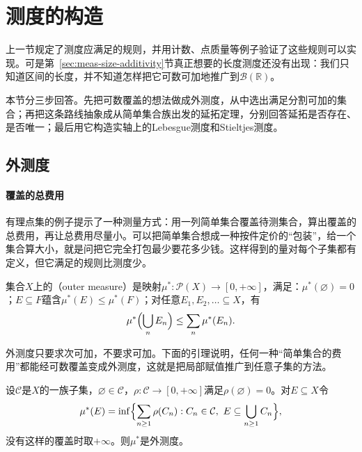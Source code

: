\section{测度的构造}
\label{sec:meas-construction}

上一节规定了测度应满足的规则，并用计数、点质量等例子验证了这些规则可以实现。可是第~\ref{sec:meas-size-additivity}节真正想要的长度测度还没有出现：我们只知道区间的长度，并不知道怎样把它可数可加地推广到$\mathcal B(\mathbb R)$。

本节分三步回答。先把可数覆盖的想法做成外测度，从中选出满足分割可加的集合；再把这条路线抽象成从简单集合族出发的延拓定理，分别回答延拓是否存在、是否唯一；最后用它构造实轴上的Lebesgue测度和Stieltjes测度。

\subsection{外测度}
\label{sec:meas-outer-measure}

\paragraph{覆盖的总费用}
有理点集的例子提示了一种测量方式：用一列简单集合覆盖待测集合，算出覆盖的总费用，再让总费用尽量小。可以把简单集合想成一种按件定价的“包装”，给一个集合算大小，就是问把它完全打包最少要花多少钱。这样得到的量对每个子集都有定义，但它满足的规则比测度少。

\begin{definition}[外测度]
\label{def:meas-outer}
集合$X$上的（outer measure）是映射$\mu^*:\mathcal P(X)\to[0,+\infty]$，满足：$\mu^*(\varnothing)=0$；$E\subseteq F$蕴含$\mu^*(E)\leq\mu^*(F)$；对任意$E_1,E_2,\dots\subseteq X$，有
\begin{equation}
 \mu^*\Bigl(\bigcup_nE_n\Bigr)\leq\sum_n\mu^*(E_n).
 \label{eq:meas-outer-subadditive}
\end{equation}
\end{definition}

外测度只要求次可加，不要求可加。下面的引理说明，任何一种“简单集合的费用”都能经可数覆盖变成外测度，这就是把局部赋值推广到任意子集的方法。

\begin{lemma}[由覆盖得到外测度]
\label{lem:meas-cover-outer}
设$\mathcal C$是$X$的一族子集，$\varnothing\in\mathcal C$，$\rho:\mathcal C\to[0,+\infty]$满足$\rho(\varnothing)=0$。对$E\subseteq X$令
\begin{equation}
 \mu^*(E)=\inf\Bigl\{\sum_{n\geq1}\rho(C_n):C_n\in\mathcal C,\ E\subseteq\bigcup_{n\geq1}C_n\Bigr\},
 \label{eq:meas-cover-outer}
\end{equation}
没有这样的覆盖时取$+\infty$。则$\mu^*$是外测度。
\end{lemma}

